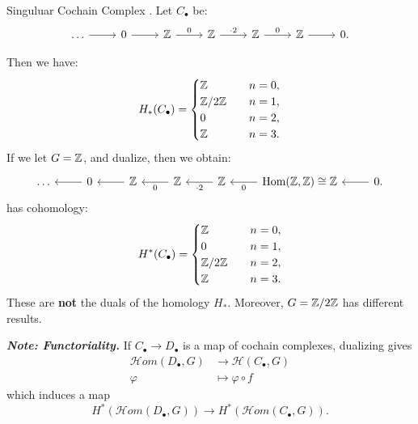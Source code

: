\documentclass{article}
\begin{document}
\begin{Example}{Singuluar Cochain Complex}
.  Let $C_{\bullet}$ be:
\begin{equation}
  \begin{tikzcd}
    \dots  \ar[r] & 0 \ar[r] & \Z \ar[r, "0"] & \Z \ar[r, "\cdot 2"] & \Z \ar[r, "0"] & \Z \ar[r] & 0.
  \end{tikzcd}
\end{equation}

Then we have:
\begin{equation}
  H_{*}(C_{\bullet}) =
  \begin{cases}
    \mathbb{Z} & \quad n = 0,\\
    \mathbb{Z} / 2\mathbb{Z} & \quad n = 1,\\
    0 & \quad n = 2,\\
    \mathbb{Z} & \quad n = 3.
  \end{cases}
\end{equation}
If we let $G = \mathbb{Z}$, and dualize, then we obtain:
\begin{equation}
  \begin{tikzcd}
    \dots & \ar[l] 0 & \ar[l] \Z & \ar[l, "0"] \Z & \ar[l, "\cdot 2"] \Z & \ar[l, "0"] \text{\normalfont Hom}(\Z, \Z) \cong \Z & \ar[l] 0.
  \end{tikzcd}
\end{equation}
has cohomology:
\begin{equation}
  H^{*}(C_{\bullet}) =
  \begin{cases}
    \mathbb{Z} & \quad n = 0,\\
    0 & \quad n = 1,\\
    \mathbb{Z} / 2\mathbb{Z} & \quad n = 2,\\
    \mathbb{Z} & \quad n = 3.
  \end{cases}
\end{equation}
These are \textbf{not} the duals of the homology $H_{*}$. Moreover, $G = \mathbb{Z}/2\mathbb{Z}$ has different results. 
\end{Example}

\textbf{\textit{Note: Functoriality.}} If $C_{\bullet} \rightarrow D_{\bullet}$ is a map of cochain complexes, dualizing gives
\begin{align}
  \mathcal{H}om (D_{\bullet}, G) &\rightarrow \mathcal{H}(C_{\bullet}, G) \\
  \varphi &\mapsto \varphi \circ f
\end{align}
which induces a map
\begin{equation}
  H^{*}(\mathcal{H}om(D_{\bullet}, G)) \rightarrow H^{*}(\mathcal{H}om(C_{\bullet}, G)).
\end{equation}
\end{document}

